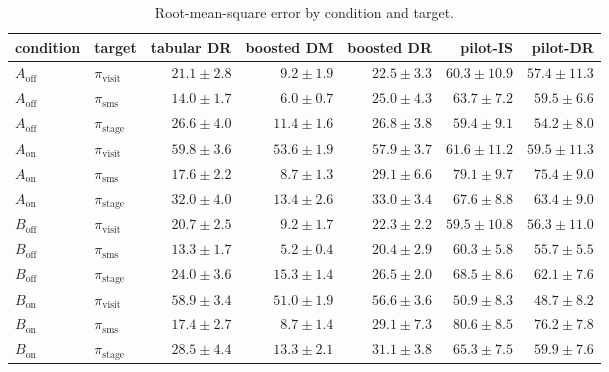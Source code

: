 \begin{table}[!htbp]
\centering
\caption{Root-mean-square error by condition and target.}
\label{tab:campaignrmse}
\small
\begin{adjustbox}{max width=\linewidth}
\begin{tabular}{llrrrrr}
\toprule
condition & target & tabular DR & boosted DM & boosted DR & pilot-IS & pilot-DR \\
\midrule
$A_{\mathrm{off}}$ & $\pi_{\mathrm{visit}}$ & $21.1 \pm 2.8$ & $9.2 \pm 1.9$ & $22.5 \pm 3.3$ & $60.3 \pm 10.9$ & $57.4 \pm 11.3$ \\
$A_{\mathrm{off}}$ & $\pi_{\mathrm{sms}}$ & $14.0 \pm 1.7$ & $6.0 \pm 0.7$ & $25.0 \pm 4.3$ & $63.7 \pm 7.2$ & $59.5 \pm 6.6$ \\
$A_{\mathrm{off}}$ & $\pi_{\mathrm{stage}}$ & $26.6 \pm 4.0$ & $11.4 \pm 1.6$ & $26.8 \pm 3.8$ & $59.4 \pm 9.1$ & $54.2 \pm 8.0$ \\
$A_{\mathrm{on}}$ & $\pi_{\mathrm{visit}}$ & $59.8 \pm 3.6$ & $53.6 \pm 1.9$ & $57.9 \pm 3.7$ & $61.6 \pm 11.2$ & $59.5 \pm 11.3$ \\
$A_{\mathrm{on}}$ & $\pi_{\mathrm{sms}}$ & $17.6 \pm 2.2$ & $8.7 \pm 1.3$ & $29.1 \pm 6.6$ & $79.1 \pm 9.7$ & $75.4 \pm 9.0$ \\
$A_{\mathrm{on}}$ & $\pi_{\mathrm{stage}}$ & $32.0 \pm 4.0$ & $13.4 \pm 2.6$ & $33.0 \pm 3.4$ & $67.6 \pm 8.8$ & $63.4 \pm 9.0$ \\
$B_{\mathrm{off}}$ & $\pi_{\mathrm{visit}}$ & $20.7 \pm 2.5$ & $9.2 \pm 1.7$ & $22.3 \pm 2.2$ & $59.5 \pm 10.8$ & $56.3 \pm 11.0$ \\
$B_{\mathrm{off}}$ & $\pi_{\mathrm{sms}}$ & $13.3 \pm 1.7$ & $5.2 \pm 0.4$ & $20.4 \pm 2.9$ & $60.3 \pm 5.8$ & $55.7 \pm 5.5$ \\
$B_{\mathrm{off}}$ & $\pi_{\mathrm{stage}}$ & $24.0 \pm 3.6$ & $15.3 \pm 1.4$ & $26.5 \pm 2.0$ & $68.5 \pm 8.6$ & $62.1 \pm 7.6$ \\
$B_{\mathrm{on}}$ & $\pi_{\mathrm{visit}}$ & $58.9 \pm 3.4$ & $51.0 \pm 1.9$ & $56.6 \pm 3.6$ & $50.9 \pm 8.3$ & $48.7 \pm 8.2$ \\
$B_{\mathrm{on}}$ & $\pi_{\mathrm{sms}}$ & $17.4 \pm 2.7$ & $8.7 \pm 1.4$ & $29.1 \pm 7.3$ & $80.6 \pm 8.5$ & $76.2 \pm 7.8$ \\
$B_{\mathrm{on}}$ & $\pi_{\mathrm{stage}}$ & $28.5 \pm 4.4$ & $13.3 \pm 2.1$ & $31.1 \pm 3.8$ & $65.3 \pm 7.5$ & $59.9 \pm 7.6$ \\
\bottomrule
\end{tabular}
\end{adjustbox}
\end{table}

